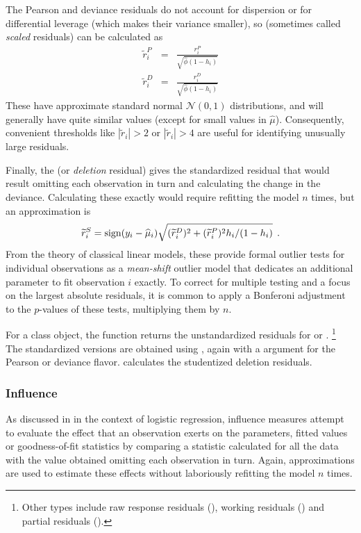 \documentclass[11pt]{book}\usepackage[]{graphicx}\usepackage[]{color}
\begin{document}
The Pearson and deviance residuals do not account for dispersion or for differential leverage
(which makes their variance smaller), so  (sometimes called \emph{scaled} residuals)
can be calculated as
\begin{eqnarray}
\widetilde{r}^P_i & = & \frac{r^P_i} {\sqrt{\widehat{\phi} (1-h_i)}} \label{eq:res-pearson-s} \\
\widetilde{r}^D_i & = & \frac{r^D_i} {\sqrt{\widehat{\phi} (1-h_i)}} \label{eq:res-deviance-s}
\end{eqnarray}
These have approximate standard normal $\mathcal{N} (0, 1)$ distributions, and will generally
have quite similar values (except for small values in $\widehat{\mu}$).
Consequently, convenient thresholds like $ | \widetilde{r}_i | > 2$ or $ | \widetilde{r}_i | > 4$
are useful for identifying unusually large residuals.

Finally, the  (or \emph{deletion} residual)
gives the standardized residual
that would result omitting each observation in turn and calculating the change in the deviance.
Calculating these exactly would require refitting the model $n$ times,
but an approximation is
\begin{equation}
\widetilde{r}^S_i = \sign (y_i - \widehat{\mu}_i) \sqrt{ (\widetilde{r}^D_i)^2 + (\widetilde{r}^P_i)^2 h_i /(1-h_i) } \period
\end{equation}
From the theory of classical linear models, these provide formal outlier tests for individual observations
\citep[\S 11.3]{Fox:2008} as a \emph{mean-shift} outlier model that dedicates an additional parameter
to fit observation $i$ exactly.  To correct for multiple testing and a focus on the largest absolute
residuals, it is common to apply a Bonferoni adjustment to the $p$-values of these tests, multiplying them by $n$.

For a class  object, the function  returns the unstandardized
residuals for  or .%
\footnote{Other types include
raw response residuals (),
working residuals () and
partial residuals ().
}
The standardized versions are obtained using , again with a  argument
for the Pearson or deviance flavor.   calculates the studentized deletion residuals.

\subsubsection{Influence}
As discussed in  in the context of logistic regression,
influence measures attempt to evaluate the effect
that an observation exerts on the parameters, fitted values or goodness-of-fit statistics
by comparing a statistic calculated for all the data with the value obtained omitting
each observation in turn.  Again, approximations are used to estimate these effects
without laboriously refitting the model $n$ times.
\end{document}
